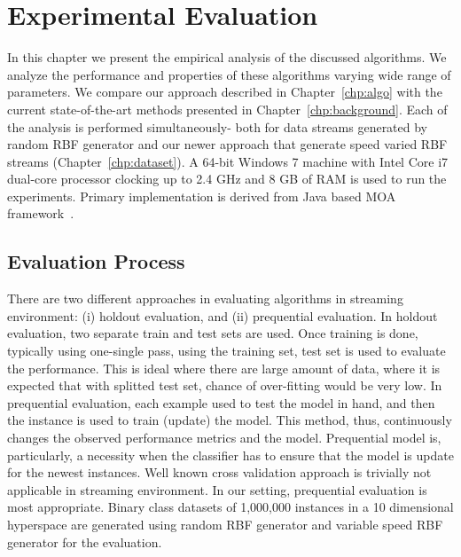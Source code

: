 \chapter{Experimental Evaluation}
\label{chp:exp}
In this chapter we present the empirical analysis of the discussed algorithms. We analyze the performance and properties of these algorithms varying wide range of parameters. We compare our approach described in Chapter~\ref{chp:algo} with the current state-of-the-art methods presented in Chapter~\ref{chp:background}. Each of the analysis is performed simultaneously- both for data streams generated by random RBF generator and our newer approach that generate speed varied RBF streams (Chapter~\ref{chp:dataset}). A 64-bit Windows 7 machine with Intel Core i7 dual-core processor clocking up to 2.4 GHz and 8 GB of RAM is used to run the experiments. Primary implementation is derived from Java based MOA framework~\cite{bifet:moa10}. 


\section{Evaluation Process}
There are two different approaches in evaluating algorithms in streaming environment: (i) holdout evaluation, and (ii) prequential evaluation. In holdout evaluation, two separate train and test sets are used. Once training is done, typically using one-single pass, using the training set, test set is used to evaluate the performance. This is ideal where there are large amount of data, where it is expected that with splitted test set, chance of over-fitting would be very low. In prequential evaluation, each example used to test the model in hand, and then the instance is used to train (update) the model. This method, thus, continuously changes the observed performance metrics and the model. Prequential model is, particularly, a necessity when the classifier has to ensure that the model is update for the newest instances. Well known cross validation approach is trivially not applicable in streaming environment. In our setting, prequential evaluation is most appropriate. Binary class datasets of 1,000,000 instances in a 10 dimensional hyperspace are generated using random RBF generator and variable speed RBF generator for the evaluation. 

